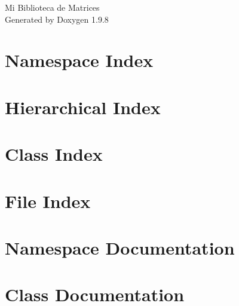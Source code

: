 \documentclass[twoside]{book}
\newcommand{\+}{\discretionary{\mbox{\scriptsize$\hookleftarrow$}}{}{}}
\newcommand{\clearemptydoublepage}{%
    \newpage{\pagestyle{empty}\cleardoublepage}%
  }
\begin{document}
  \raggedbottom
    \hypersetup{pageanchor=false,
                bookmarksnumbered=true,
                pdfencoding=unicode
               }
  \begin{titlepage}
  \vspace*{7cm}
  \begin{center}%
  {\Large Mi Biblioteca de Matrices}\\
  \vspace*{1cm}
  {\large Generated by Doxygen 1.9.8}\\
  \end{center}
  \end{titlepage}
  \clearemptydoublepage
  \tableofcontents
  \clearemptydoublepage
  \hypersetup{pageanchor=true}

\chapter{Namespace Index}

\chapter{Hierarchical Index}

\chapter{Class Index}

\chapter{File Index}

\chapter{Namespace Documentation}

\chapter{Class Documentation}









\end{document}

